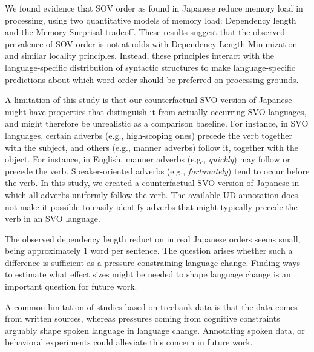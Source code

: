 \documentclass[11pt,a4paper]{article}
\begin{document}
We found evidence that SOV order as found in Japanese reduce memory load in processing, using two quantitative models of memory load: Dependency length and the Memory-Surprisal tradeoff.
These results suggest that the observed prevalence of SOV order is not at odds with Dependency Length Minimization and similar locality principles.
Instead, these principles interact with the language-specific distribution of syntactic structures to make language-specific predictions about which word order should be preferred on processing grounds.


A limitation of this study is that our counterfactual SVO version of Japanese might have properties that distinguish it from actually occurring SVO languages,
and might therefore be unrealistic as a comparison baseline. 
For instance, in SVO languages, certain adverbs (e.g., high-scoping ones) precede the verb together with the subject, and others (e.g., manner adverbs) follow it, together with the object.
For instance, in English, manner adverbs (e.g., \emph{quickly}) may follow or precede the verb. Speaker-oriented adverbs (e.g., \emph{fortunately}) tend to occur before the verb.
In this study, we created a counterfactual SVO version of Japanese in which all adverbs uniformly follow the verb.
The available UD annotation does not make it possible to easily identify adverbs that might typically precede the verb in an SVO language.



The observed dependency length reduction in real Japanese orders seems small, being approximately 1 word per sentence.
The question arises whether such a difference is sufficient as a pressure constraining language change.
Finding ways to estimate what effect sizes might be needed to shape language change is an important question for future work. %


A common limitation of studies based on treebank data is that the data comes from written sources, whereas pressures coming from cognitive constraints arguably shape spoken language in language change.
Annotating spoken data, or behavioral experiments could alleviate this concern in future work. %
\end{document}
